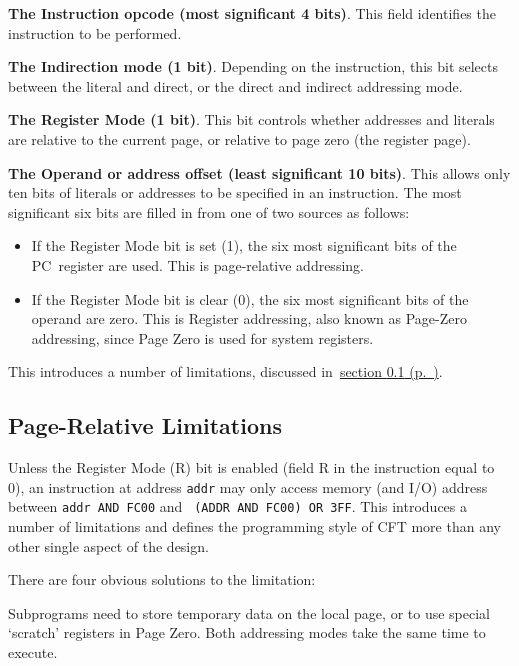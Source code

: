 \documentclass[11pt,a4paper,twocolumns]{article}
\newcommand{\cf}[2][section]{\hyperref[#2]{#1 \ref*{#2} (p.~\pageref*{#2})}}
\newcommand\register[1]{\textsf{#1}}
\newcommand\PC{\register{PC}}
\begin{document}
\begin{description}
\item{\bf The Instruction opcode (most significant 4 bits)}. This
  field identifies the instruction to be performed.
\item{\bf The Indirection mode (1 bit)}. Depending on the instruction,
  this bit selects between the literal and direct, or the direct and
  indirect addressing mode.
\item{\bf The Register Mode (1 bit)}. This bit controls whether
  addresses and literals are relative to the current page, or relative
  to page zero (the register page).
\item{\bf The Operand or address offset (least significant 10
  bits)}. This allows only ten bits of literals or addresses to be
  specified in an instruction. The most significant six bits are
  filled in from one of two sources as follows:
  \begin{itemize}
  \item If the Register Mode bit is set (1), the six most significant bits
    of the \PC\ register are used. This is page-relative addressing.
  \item If the Register Mode bit is clear (0), the six most
    significant bits of the operand are zero. This is Register
    addressing, also known as Page-Zero addressing, since Page Zero is
    used for system registers.
  \end{itemize}
  This introduces a number of limitations, discussed in~\cf{sec-pagerel}.
\end{description}

\subsection{Page-Relative Limitations}
\label{sec-pagerel}

Unless the Register Mode (R) bit is enabled (field R in the
instruction equal to 0), an instruction at address {\tt addr} may only
access memory (and I/O) address between {\tt addr AND FC00} and {\tt
  (ADDR AND FC00) OR 3FF}. This introduces a number of limitations and
defines the programming style of CFT more than any other single
aspect of the design.

There are four obvious solutions to the limitation:

Subprograms need to store temporary data on the local page, or to use
special ‘scratch’ registers in Page Zero. Both addressing modes take
the same time to execute.
\end{document}
